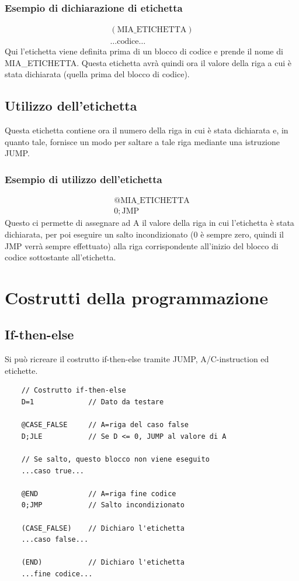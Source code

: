 \documentclass[12pt]{article}
\begin{document}
\subsubsection{Esempio di dichiarazione di etichetta}
\label{sssec:esempio_dichiarazione_etichetta}
\begin{gather*}
    (\text{MIA\_ETICHETTA})\\
    \dots \text{codice} \dots
\end{gather*}
Qui l'etichetta viene definita prima di un blocco di codice e prende il nome di MIA\_ETICHETTA.
Questa etichetta avrà quindi ora il valore della riga a cui è stata dichiarata (quella prima del blocco di codice).

\subsection{Utilizzo dell'etichetta}
\label{ssec:utilizzo_etichetta}
Questa etichetta contiene ora il numero della riga in cui è stata dichiarata e, in quanto tale, fornisce un modo per saltare a tale riga mediante una istruzione JUMP.
\subsubsection{Esempio di utilizzo dell'etichetta}
\label{sssec:esempio_utilizzo_etichetta}
\begin{gather*}
    @\text{MIA\_ETICHETTA}\\
    0;\text{JMP}
\end{gather*}
Questo ci permette di assegnare ad A il valore della riga in cui l'etichetta è stata dichiarata, per poi eseguire un salto incondizionato (0 è sempre zero, quindi il JMP verrà sempre effettuato) alla riga corrispondente all'inizio del blocco di codice sottostante all'etichetta.
\pagebreak

\section{Costrutti della programmazione}
\label{sec:costrutti_programmazione}

\subsection{If-then-else}
\label{ssec:if_then_else}
Si può ricreare il costrutto if-then-else tramite JUMP, A/C-instruction ed etichette.
\begin{lstlisting}
    // Costrutto if-then-else
    D=1             // Dato da testare

    @CASE_FALSE     // A=riga del caso false
    D;JLE           // Se D <= 0, JUMP al valore di A

    // Se salto, questo blocco non viene eseguito
    ...caso true... 

    @END            // A=riga fine codice
    0;JMP           // Salto incondizionato

    (CASE_FALSE)    // Dichiaro l'etichetta
    ...caso false...

    (END)           // Dichiaro l'etichetta
    ...fine codice...
\end{lstlisting}
\end{document}
